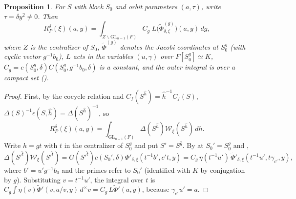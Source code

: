 \documentclass[11pt,oneside,notitlepage]{book}
\numberwithin{equation}{section}
\theoremstyle{plain}
\newtheorem{proposition}[theorem]{Proposition}
\theoremstyle{definition}
\newcommand{\GL}{\mathrm{GL}}
\newcommand{\cW}{\mathcal{W}}
\begin{document}
\begin{proposition}\label{prop:odd-lin}
	For $S$ with block $S_0$ and orbit parameters $(a,\tau)$, write $\tau=\delta y^2\ne0$. Then
	\[R_P^\delta(\xi)(a,y)=\int_{Z\backslash\GL_{n-1}(F)}C_g\;L\bigl(\tilde\Phi^{(g)}_{\delta,\xi}\bigr)(a,y)\,d\dot g,\]
	where $Z$ is the centralizer of $S_0$, $\tilde\Phi^{(g)}$ denotes the Jacobi coordinates at $S_0^g$ (with cyclic vector $g^{-1}b_0$), $L$ acts in the variables $(u,\gamma)$ over $F[S_0^g]\simeq K$, $C_g=c(S_0^g,\delta)C(S_0^g,g^{-1}b_0,\delta)$ is a constant, and the outer integral is over a compact set ().
\end{proposition}
\begin{proof}
	First, by the cocycle relation and $C_f(S^{\hat h})=\hat h^{-1}C_f(S)$, $\Delta(S)^{-1}\epsilon(S,\hat h)=\Delta(S^{\hat h})^{-1}$, so
	\[R_P^\delta(\xi)(a,y)=\int_{\GL_{n-1}(F)}\Delta(S^{\hat h})\cW_\xi(S^{\hat h})\,dh.\]
	Write $h=gt$ with $t$ in the centralizer of $S_0^g$ and put $S'=S^{\hat g}$. By  at $S_0'=S_0^g$ and ,
	\[\Delta(S'^{\hat t})\cW_\xi(S'^{\hat t})=G(S'^{\hat t})c(S_0',\delta)\Phi'_{\delta,\xi}(t^{-1}b',c't,y)=C_g\,\eta(t^{-1}u')\,\tilde\Phi'_{\delta,\xi}(t^{-1}u',t\gamma_{c'},y),\]
	where $b'=u'g^{-1}b_0$ and the primes refer to $S_0'$ (identified with $K$ by conjugation by $g$). Substituting $v=t^{-1}u'$, the integral over $t$ is $C_g\int\eta(v)\tilde\Phi'(v,a/v,y)\,d^\times v=C_g\,L\tilde\Phi'(a,y)$, because $\gamma_{c'}u'=a$.
\end{proof}
\end{document}
